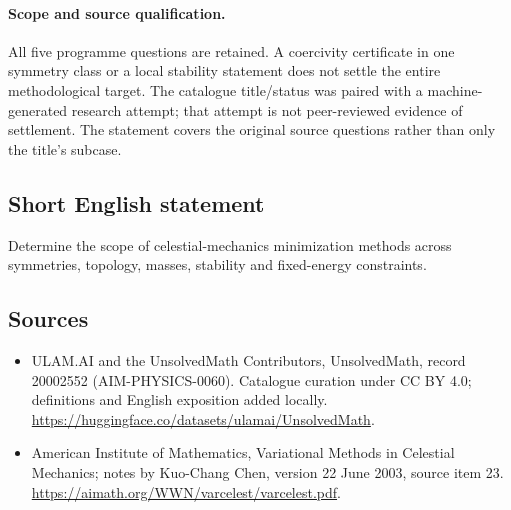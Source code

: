 \documentclass[11pt]{article}
\begin{document}
\paragraph{Scope and source qualification.}All five programme questions are retained. A coercivity certificate in one symmetry class or a local stability statement does not settle the entire methodological target. The catalogue title/status was paired with a machine-generated research attempt; that attempt is not peer-reviewed evidence of settlement. The statement covers the original source questions rather than only the title’s subcase.
\subsection{Short English statement}
Determine the scope of celestial-mechanics minimization methods across symmetries, topology, masses, stability and fixed-energy constraints.
\subsection{Sources}
\begin{itemize}
\item[\hypertarget{source:20002552:1}{S1}] ULAM.AI and the UnsolvedMath Contributors, UnsolvedMath, record 20002552 (AIM-PHYSICS-0060). Catalogue curation under CC BY 4.0; definitions and English exposition added locally.
\url{https://huggingface.co/datasets/ulamai/UnsolvedMath}.
\item[\hypertarget{source:20002552:2}{S2}] American Institute of Mathematics, Variational Methods in Celestial Mechanics; notes by Kuo-Chang Chen, version 22 June 2003, source item 23.
\url{https://aimath.org/WWN/varcelest/varcelest.pdf}.
\end{itemize}
\label{end:20002552}
\end{document}
